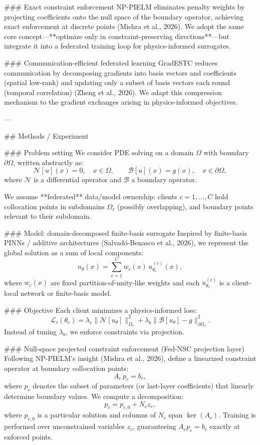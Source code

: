 ### Exact constraint enforcement  
NP-PIELM eliminates penalty weights by projecting coefficients onto the null space of the boundary operator, achieving exact enforcement at discrete points (Mishra et al., 2026). We adopt the same core concept—**optimize only in constraint-preserving directions**—but integrate it into a federated training loop for physics-informed surrogates.

### Communication-efficient federated learning  
GradESTC reduces communication by decomposing gradients into basis vectors and coefficients (spatial low-rank) and updating only a subset of basis vectors each round (temporal correlation) (Zheng et al., 2026). We adapt this compression mechanism to the gradient exchanges arising in physics-informed objectives.

---

## Methods / Experiment  

### Problem setting  
We consider PDE solving on a domain \(\Omega\) with boundary \(\partial\Omega\), written abstractly as:  
\[
\mathcal{N}[u](x)=0,\quad x\in\Omega,\qquad \mathcal{B}[u](x)=g(x),\quad x\in\partial\Omega,
\]
where \(\mathcal{N}\) is a differential operator and \(\mathcal{B}\) a boundary operator.

We assume **federated** data/model ownership: clients \(c=1,\dots,C\) hold collocation points in subdomains \(\Omega_c\) (possibly overlapping), and boundary points relevant to their subdomain.

### Model: domain-decomposed finite-basis surrogate  
Inspired by finite-basis PINNs / additive architectures (Salvadó-Benasco et al., 2026), we represent the global solution as a sum of local components:
\[
u_\theta(x)=\sum_{c=1}^C w_c(x)\, u_{\theta_c}^{(c)}(x),
\]
where \(w_c(x)\) are fixed partition-of-unity-like weights and each \(u_{\theta_c}^{(c)}\) is a client-local network or finite-basis model.

### Objective  
Each client minimizes a physics-informed loss:
\[
\mathcal{L}_c(\theta_c)=\lambda_r \| \mathcal{N}[u_\theta]\|^2_{\Omega_c} + \lambda_b \|\mathcal{B}[u_\theta]-g\|^2_{\partial\Omega_c}.
\]
Instead of tuning \(\lambda_b\), we enforce constraints via projection.

### Null-space projected constraint enforcement (Fed-NSC projection layer)  
Following NP-PIELM’s insight (Mishra et al., 2026), define a linearized constraint operator at boundary collocation points:
\[
A_c \, p_c = b_c,
\]
where \(p_c\) denotes the subset of parameters (or last-layer coefficients) that linearly determine boundary values. We compute a decomposition:
\[
p_c = p_{c,0} + N_c z_c,
\]
where \(p_{c,0}\) is a particular solution and columns of \(N_c\) span \(\ker(A_c)\). Training is performed over unconstrained variables \(z_c\), guaranteeing \(A_c p_c=b_c\) exactly at enforced points.

